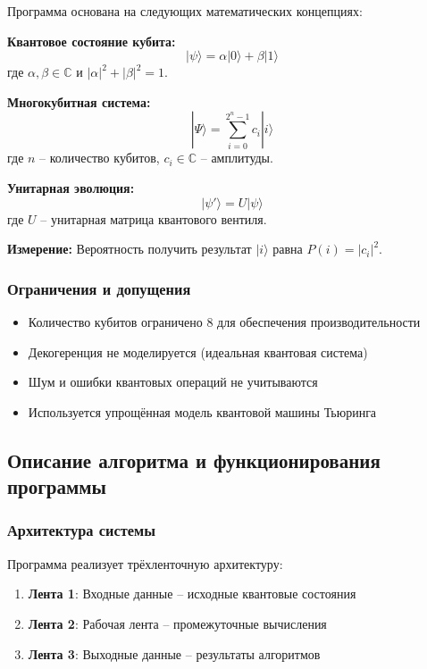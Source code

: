 \documentclass[14pt,russian]{extarticle}
\begin{document}
Программа основана на следующих математических концепциях:

\textbf{Квантовое состояние кубита:}
$$|\psi\rangle = \alpha|0\rangle + \beta|1\rangle$$
где $\alpha, \beta \in \mathbb{C}$ и $|\alpha|^2 + |\beta|^2 = 1$.

\textbf{Многокубитная система:}
$$|\Psi\rangle = \sum_{i=0}^{2^n-1} c_i |i\rangle$$
где $n$ -- количество кубитов, $c_i \in \mathbb{C}$ -- амплитуды.

\textbf{Унитарная эволюция:}
$$|\psi'\rangle = U|\psi\rangle$$
где $U$ -- унитарная матрица квантового вентиля.

\textbf{Измерение:}
Вероятность получить результат $|i\rangle$ равна $P(i) = |c_i|^2$.

\subsubsection{Ограничения и допущения}

\begin{itemize}
    \item Количество кубитов ограничено 8 для обеспечения производительности
    \item Декогеренция не моделируется (идеальная квантовая система)
    \item Шум и ошибки квантовых операций не учитываются
    \item Используется упрощённая модель квантовой машины Тьюринга
\end{itemize}

\subsection{Описание алгоритма и функционирования программы}

\subsubsection{Архитектура системы}

Программа реализует трёхленточную архитектуру:
\begin{enumerate}
    \item \textbf{Лента 1}: Входные данные -- исходные квантовые состояния
    \item \textbf{Лента 2}: Рабочая лента -- промежуточные вычисления
    \item \textbf{Лента 3}: Выходные данные -- результаты алгоритмов
\end{enumerate}
\end{document}
